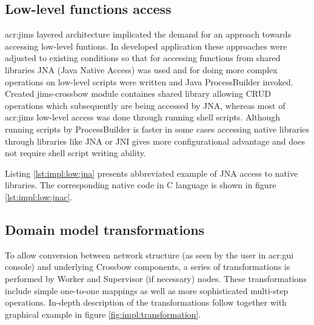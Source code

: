 \documentclass[11pt]{book}
\begin{document}
		\subsection{Low-level functions access}
			\label{sec:impl:low}

			\gls{acr:jims} layered architecture implicated the demand for an approach towards accessing low-level funtions. In developed
			application these approaches were adjusted to existing conditions so that for accessing functions from shared
			libraries JNA (Java Native Access) was used and for doing more complex operations on low-level scripts were
			written and Java ProcessBuilder invoked. Created jims-crossbow module containes shared library allowing CRUD
			operations which subsequently are being accessed by JNA, whereas most of \gls{acr:jims} low-level access was done through
			running shell scripts. Although running scripts by ProcessBuilder is faster in some cases accessing native
			libraries through libraries like JNA or JNI gives more configurational advantage and does not require shell script
			writing ability.

			Listing \ref{lst:impl:low:jna} presents abbreviated example of JNA access to native libraries. The corresponding
			native code in C language is shown in figure \ref{lst:impl:low:jnac}. \\
 	
	
			\noindent
				\begin{minipage}{\textwidth}
				
			\end{minipage}  

			\noindent
			\begin{minipage}{\textwidth}
				
			\end{minipage}


      \subsection{Domain model transformations}
      \label{sec:impl:model}

        To allow conversion between network structure (as seen by the user in \gls{acr:gui} console) and underlying
        Crossbow components, a series of transformations is performed by Worker and Supervisor (if necessary) nodes.
        These transformations include simple one-to-one mappings as well as more sophisticated multi-step operations.
        In-depth description of the transformations follow together with graphical example in figure
        \ref{fig:impl:transformation}.
\end{document}
